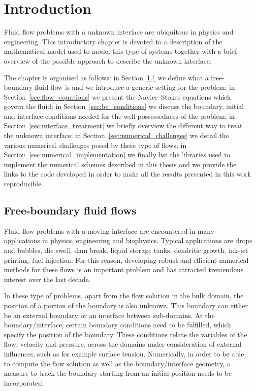 \chapter{\sc Introduction}\label{ch:introduction}
Fluid flow problems with a unknown interface are ubiquitous in physics and
engineering. This introductory chapter is devoted to a description of the
mathematical model used to model this type of systems together with a brief
overview of the possible approach to describe the unknown interface.

The chapter is organised as follows: in Section~\ref{sec:free_boundary_flows}
we define what a free-boundary fluid flow is and we introduce a generic setting
for the problem; in Section~\ref{sec:flow_equations} we present the
Navier--Stokes equations which govern the fluid; in
Section~\ref{sec:bc_conditions} we discuss the boundary, initial and interface
conditions needed for the well possessedness of the problem; in
Section~\ref{sec:interface_treatment} we briefly overview the different way to
treat the unknown interface; in Section~\ref{sec:numerical_challenges} we detail
the various numerical challenges posed by these type of flows; in
Section~\ref{sec:numerical_implementation} we finally list the libraries used to
implement the numerical schemes described in this thesis and we provide the
links to the code developed in order to make all the results presented in this
work reproducible.

\section{Free-boundary fluid flows}\label{sec:free_boundary_flows}
Fluid flow problems with a moving interface are encountered in many
applications in physics, engineering and biophysics. Typical applications are
drops and bubbles, die swell, dam break, liquid storage tanks, dendritic growth,
ink-jet printing, fuel injection. For this reason, developing robust and
efficient numerical methods for these flows is an important problem and
has attracted tremendous interest over the last decade.

In these type of problems, apart from the flow solution in the bulk domain, the
position of a portion of the boundary is also unknown. This boundary can either
be an external boundary or an interface between sub-domains. At the
boundary/interface, certain boundary conditions need to be fulfilled, which
specify the position of the boundary. These conditions relate the variables of
the flow, velocity and pressure, across the domains under consideration of
external influences, such as for example surface tension. Numerically, in order
to be able to compute the flow solution as well as the boundary/interface
geometry, a measure to track the boundary starting from an initial position
needs to be incorporated.

